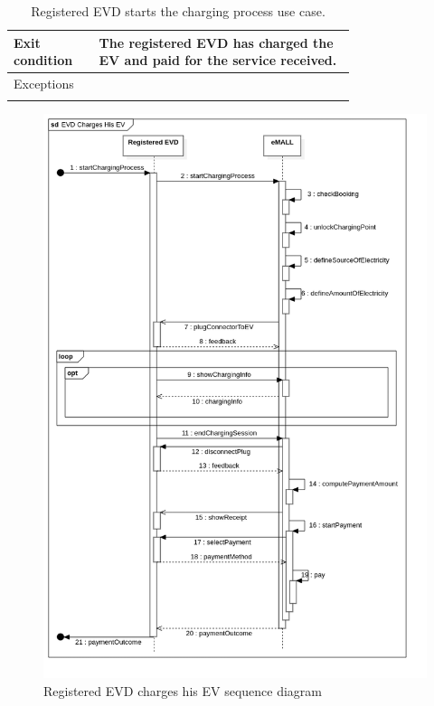 \begin{center}
\begin{longtable}{lp{0.75\linewidth}}
        Exit condition   & The registered EVD has charged the EV and paid for the service received.                                                    \\
        \hline
        Exceptions       &                                                                                                                             \\
        \hline
        \caption{Registered EVD starts the charging process use case.}
        \label{tab: EVD_charges_EV_use_case}
    \end{longtable}
    \begin{figure} [H]
        \begin{center}
            \includegraphics[width=0.9\linewidth]{Images/SequenceDiagrams/evd_charges_his_ev}
            \caption{Registered EVD charges his EV sequence diagram}
            \label{fig:evd_starts_charging_seq_diag}
        \end{center}
    \end{figure}
\end{center}

